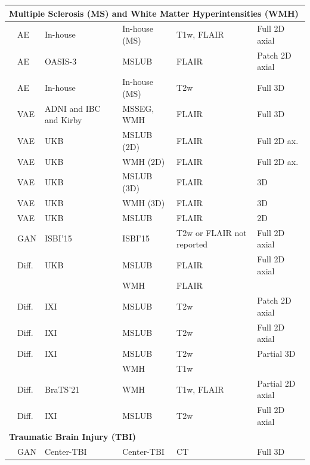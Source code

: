\begin{longtable}{p{4.2cm}p{1.3cm}p{3.2cm}p{3cm}p{4cm}p{3.3cm}}
\multicolumn{6}{l}{\textbf{Multiple Sclerosis (MS) and White Matter Hyperintensities (WMH)}} \\
\midrule
\citet{Baur2018} & AE & In-house & In-house (MS) & T1w, FLAIR & Full 2D axial \\
\citet{Ghorbel2023} & AE & OASIS-3 & MSLUB & FLAIR & Patch 2D axial \\
\citet{Luo2023} & AE & In-house & In-house (MS) & T2w & Full 3D \\
\citet{Lambert2021} & VAE & ADNI and IBC and Kirby & MSSEG, WMH & FLAIR & Full 3D \\
\citet{Pinaya2022-2} & VAE & UKB & MSLUB (2D)& FLAIR & Full 2D ax.\\
\citet{Pinaya2022-2} & VAE & UKB & WMH (2D)& FLAIR & Full 2D ax.\\
\citet{Pinaya2022-2} & VAE & UKB & MSLUB (3D) & FLAIR & 3D\\
\citet{Pinaya2022-2} & VAE & UKB & WMH (3D)& FLAIR & 3D\\
\citet{Pinaya2022-2} & VAE & UKB & MSLUB & FLAIR & 2D\\
\citet{Dey2021} & GAN & ISBI'15 & ISBI'15 & T2w or FLAIR not reported & Full 2D axial \\
\citet{Pinaya2022-1} & Diff. & UKB & MSLUB & FLAIR & Full 2D axial\\
 & & & WMH & FLAIR &  \\
\citet{Behrendt2023} & Diff. & IXI & MSLUB & T2w & Patch 2D axial \\
\citet{Iqbal2023} & Diff. & IXI & MSLUB & T2w & Full 2D axial \\
\citet{Behrendt2024} & Diff. & IXI & MSLUB & T2w & Partial 3D \\
 & & & WMH & T1w & \\
\citet{Fontanella2024} & Diff. & BraTS'21 & WMH & T1w, FLAIR & Partial 2D axial \\
\citet{Kumar2024} & Diff. & IXI & MSLUB & T2w & Full 2D axial \\
\hline

\multicolumn{6}{l}{\textbf{Traumatic Brain Injury (TBI)}} \\
\midrule
\citet{Simarro2020} & GAN & Center-TBI & Center-TBI & CT & Full 3D\\
\end{longtable}